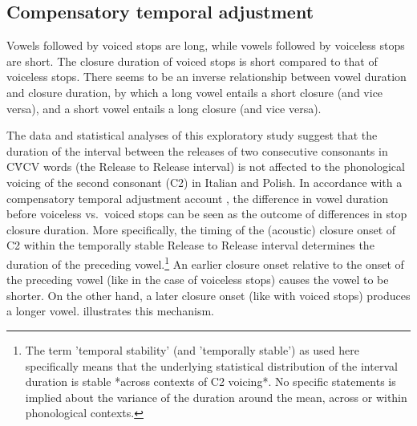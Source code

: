 \documentclass[12pt,]{article}
\let\rmarkdownfootnote\footnote%
\def\footnote{\protect\rmarkdownfootnote}
\begin{document}
\hypertarget{compensatory-temporal-adjustment}{%
\subsection{Compensatory temporal
adjustment}\label{compensatory-temporal-adjustment}}

Vowels followed by voiced stops are long, while vowels followed by
voiceless stops are short. The closure duration of voiced stops is short
compared to that of voiceless stops. There seems to be an inverse
relationship between vowel duration and closure duration, by which a
long vowel entails a short closure (and vice versa), and a short vowel
entails a long closure (and vice versa).

The data and statistical analyses of this exploratory study suggest that
the duration of the interval between the releases of two consecutive
consonants in CV́CV words (the Release to Release interval) is not
affected to the phonological voicing of the second consonant (C2) in
Italian and Polish. In accordance with a compensatory temporal
adjustment account \citep{slis1969, lehiste1970}, the difference in
vowel duration before voiceless vs.~voiced stops can be seen as the
outcome of differences in stop closure duration. More specifically, the
timing of the (acoustic) closure onset of C2 within the temporally
stable Release to Release interval determines the duration of the
preceding
vowel.\footnote{The term 'temporal stability' (and 'temporally stable') as used here specifically means that the underlying statistical distribution of the interval duration is stable *across contexts of C2 voicing*. No specific statements is implied about the variance of the duration around the mean, across or within phonological contexts.}
An earlier closure onset relative to the onset of the preceding vowel
(like in the case of voiceless stops) causes the vowel to be shorter. On
the other hand, a later closure onset (like with voiced stops) produces
a longer vowel.  illustrates this mechanism.
\end{document}
